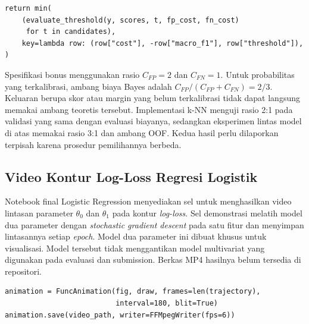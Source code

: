 \begin{lstlisting}[caption={Pemilihan ambang berdasarkan biaya dan Macro F1},label={lst-cost-sensitive-threshold}]
return min(
    (evaluate_threshold(y, scores, t, fp_cost, fn_cost)
     for t in candidates),
    key=lambda row: (row["cost"], -row["macro_f1"], row["threshold"]),
)
\end{lstlisting}

Spesifikasi bonus menggunakan rasio $C_{FP}=2$ dan $C_{FN}=1$. Untuk probabilitas yang terkalibrasi, ambang biaya Bayes adalah
$C_{FP}/(C_{FP}+C_{FN})=2/3$. Keluaran berupa skor atau margin yang belum terkalibrasi tidak dapat langsung memakai ambang teoretis tersebut. Implementasi k-NN menguji rasio 2:1 pada validasi yang sama dengan evaluasi biayanya, sedangkan eksperimen lintas model di atas memakai rasio 3:1 dan ambang OOF. Kedua hasil perlu dilaporkan terpisah karena prosedur pemilihannya berbeda.

\subsection{Video Kontur Log-Loss Regresi Logistik}

Notebook final Logistic Regression menyediakan sel untuk menghasilkan video lintasan parameter $\theta_0$ dan $\theta_1$ pada kontur \textit{log-loss}. Sel demonstrasi melatih model dua parameter dengan \textit{stochastic gradient descent} pada satu fitur dan menyimpan lintasannya setiap \textit{epoch}. Model dua parameter ini dibuat khusus untuk visualisasi. Model tersebut tidak menggantikan model multivariat yang digunakan pada evaluasi dan submission. Berkas MP4 hasilnya belum tersedia di repositori.

\begin{lstlisting}[caption={Penyimpanan lintasan parameter sebagai video},label={lst-lr-contour-video}]
animation = FuncAnimation(fig, draw, frames=len(trajectory),
                          interval=180, blit=True)
animation.save(video_path, writer=FFMpegWriter(fps=6))
\end{lstlisting}
